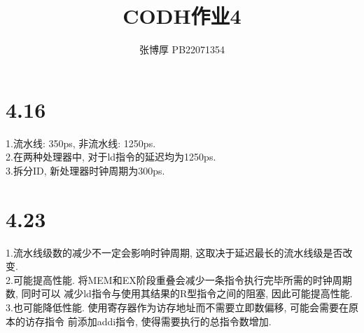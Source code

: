 \documentclass{article}
\title{CODH作业4}
\author{张博厚 PB22071354}
\date{}
\begin{document}
\maketitle

\section*{4.16}
1.流水线: 350ps, 非流水线: 1250ps.\\
2.在两种处理器中, 对于ld指令的延迟均为1250ps.\\
3.拆分ID, 新处理器时钟周期为300ps.

\section*{4.23}
1.流水线级数的减少不一定会影响时钟周期, 这取决于延迟最长的流水线级是否改变.\\
2.可能提高性能. 将MEM和EX阶段重叠会减少一条指令执行完毕所需的时钟周期数, 同时可以
减少ld指令与使用其结果的R型指令之间的阻塞, 因此可能提高性能.\\
3.也可能降低性能. 使用寄存器作为访存地址而不需要立即数偏移, 可能会需要在原本的访存指令
前添加addi指令, 使得需要执行的总指令数增加.
\end{document}
